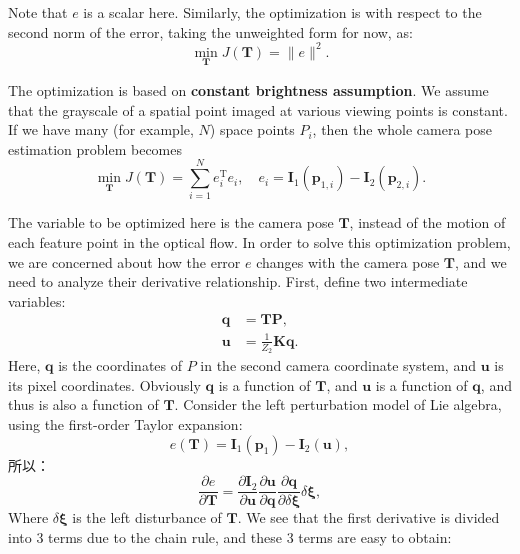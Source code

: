 {Note that $e$ is a scalar here. Similarly, the optimization is with respect to the second norm of the error, taking the unweighted form for now, as:
\begin{equation}
\mathop {\min }\limits_{\bm{T}}  J\left( \bm{T}  \right) = \|e\|^2.
\end{equation}

The optimization is based on \textbf{constant brightness assumption}. We assume that the grayscale of a spatial point imaged at various viewing points is constant. If we have many (for example, $N$) space points $P_i$, then the whole camera pose estimation problem becomes
\begin{equation}
\mathop {\min }\limits_{\bm{T}}  J\left( \bm{T}  \right) = \sum\limits_{i = 1}^N {e_i^\mathrm{T}{e_i}}, \quad {e_i} = {\bm{I}_1}\left( {{\bm{p}_{1,i}}} \right) - {\bm{I}_2}\left( {{ \bm{p}_{2,i}}} \right).
\end{equation}

The variable to be optimized here is the camera pose $\bm{T}$, instead of the motion of each feature point in the optical flow. In order to solve this optimization problem, we are concerned about how the error $e$ changes with the camera pose $\bm{T}$, and we need to analyze their derivative relationship. First, define two intermediate variables:
\begin{align*}
\bm{q} &= \bm{T} \bm{P}, \\
\bm{u} &= \frac{1}{{{Z_2}}} \bm{K} \bm{q}.
\end{align*}
Here, $\bm{q}$ is the coordinates of $P$ in the second camera coordinate system, and $\bm{u}$ is its pixel coordinates. Obviously $\bm{q}$ is a function of $\bm{T}$, and $\bm{u}$ is a function of $\bm{q}$, and thus is also a function of $\bm{T}$. Consider the left perturbation model of Lie algebra, using the first-order Taylor expansion:
\begin{equation}
e(\bm{T})=\bm{I}_1(\bm{p}_{1})-\bm{I}_2(\bm{u}),
\end{equation}
所以：
\begin{equation}
\frac{\partial e}{\partial \bm{T}} = \frac{{\partial {\bm{I}_2}}}{{\partial \bm{u}}}\frac{{\partial \bm{u}}}{{\partial \bm{q}}}\frac{{\partial \bm{q}}}{{\partial \delta \bm{\xi} }}\delta \bm{\xi},
\end{equation}
Where $\delta \bm{\xi}$ is the left disturbance of $\bm{T}$. We see that the first derivative is divided into 3 terms due to the chain rule, and these 3 terms are easy to obtain:

}
